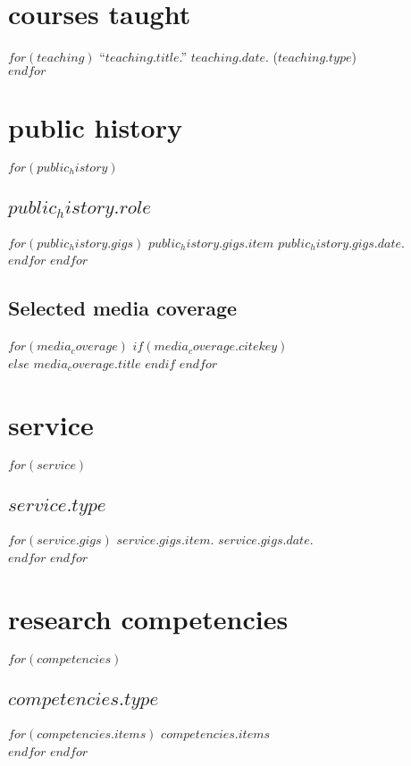 \documentclass[11pt, a4paper]{article}
\begin{document}
\section{courses taught}

$for(teaching)$
``$teaching.title$.'' $teaching.date$. ($teaching.type$)\\[.15cm]
$endfor$


\section{public history}

$for(public_history)$
\subsection{$public_history.role$}
$for(public_history.gigs)$
$public_history.gigs.item$ $public_history.gigs.date$.\\[.15cm]
$endfor$
$endfor$
\subsection{Selected media coverage}

$for(media_coverage)$
$if(media_coverage.citekey)$
\\
$else$
$media_coverage.title$
$endif$
$endfor$


\section{service}
$for(service)$
\subsection{$service.type$}
$for(service.gigs)$
$service.gigs.item$. $service.gigs.date$.\\[.15cm]
$endfor$
$endfor$


\section{research competencies}
$for(competencies)$
\subsection{$competencies.type$}
$for(competencies.items)$
$competencies.items$\\[.15cm]
$endfor$
$endfor$
\end{document}
